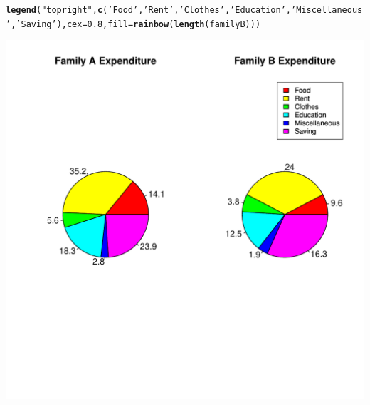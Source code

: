 \documentclass{article}\usepackage[]{graphicx}\usepackage[]{xcolor}
\makeatletter
\def\maxwidth{ %
  \ifdim\Gin@nat@width>\linewidth
    \linewidth
  \else
    \Gin@nat@width
  \fi
}
\newcommand{\hlnum}[1]{\textcolor[rgb]{0.686,0.059,0.569}{#1}}%
\newcommand{\hlsng}[1]{\textcolor[rgb]{0.192,0.494,0.8}{#1}}%
\newcommand{\hldef}[1]{\textcolor[rgb]{0.345,0.345,0.345}{#1}}%
\newcommand{\hlkwc}[1]{\textcolor[rgb]{0.333,0.667,0.333}{#1}}%
\newcommand{\hlkwd}[1]{\textcolor[rgb]{0.737,0.353,0.396}{\textbf{#1}}}%
\newenvironment{kframe}{%
 \def\at@end@of@kframe{}%
 \ifinner\ifhmode%
  \def\at@end@of@kframe{\end{minipage}}%
  \begin{minipage}{\columnwidth}%
 \fi\fi%
 \def\FrameCommand##1{\hskip\@totalleftmargin \hskip-\fboxsep
 \colorbox{shadecolor}{##1}\hskip-\fboxsep
     \hskip-\linewidth \hskip-\@totalleftmargin \hskip\columnwidth}%
 \MakeFramed {\advance\hsize-\width
   \@totalleftmargin\z@ \linewidth\hsize
   \@setminipage}}%
 {\par\unskip\endMakeFramed%
 \at@end@of@kframe}
\newenvironment{knitrout}{}{} %
\makeatother
\begin{document}
\begin{knitrout}
\begin{kframe}
\begin{alltt}
\hlkwd{legend}\hldef{(}\hlsng{"topright"}\hldef{,} \hlkwd{c}\hldef{(}\hlsng{'Food'}\hldef{,}\hlsng{'Rent'}\hldef{,}\hlsng{'Clothes'}\hldef{,}\hlsng{'Education'}\hldef{,}\hlsng{'Miscellaneous'}\hldef{,} \hlsng{'Saving'}\hldef{),} \hlkwc{cex} \hldef{=} \hlnum{0.8}\hldef{,}\hlkwc{fill} \hldef{=} \hlkwd{rainbow}\hldef{(}\hlkwd{length}\hldef{(familyB)))}
\end{alltt}
\end{kframe}
\includegraphics[width=\maxwidth]{figure/unnamed-chunk-1-1} 
\end{knitrout}
\newpage
\end{document}
